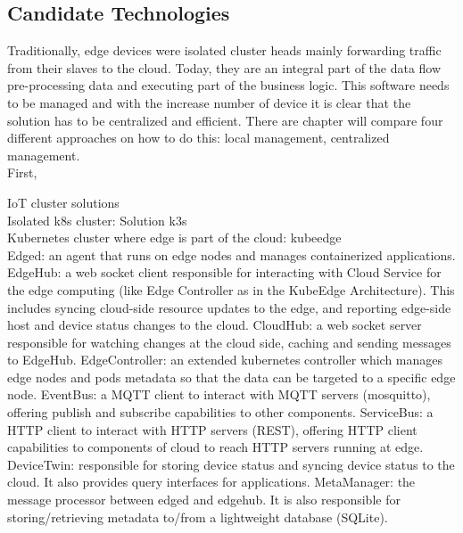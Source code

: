 \subsection{Candidate Technologies}
Traditionally, edge devices were isolated cluster heads mainly forwarding traffic from their slaves to the cloud. Today, they are an integral part of the data flow pre-processing data and executing part of the business logic. This software needs to be managed and with the increase number of device it is clear that the solution has to be centralized and efficient. There are  chapter will compare four different approaches on how to do this: local management, centralized management. \\
First,

IoT cluster solutions\\
Isolated k8s cluster: Solution k3s\\
Kubernetes cluster where edge is part of the cloud: kubeedge\\


Edged: an agent that runs on edge nodes and manages containerized applications.
EdgeHub: a web socket client responsible for interacting with Cloud Service for the edge computing (like Edge Controller as in the KubeEdge Architecture). This includes syncing cloud-side resource updates to the edge, and reporting edge-side host and device status changes to the cloud.
CloudHub: a web socket server responsible for watching changes at the cloud side, caching and sending messages to EdgeHub.
EdgeController: an extended kubernetes controller which manages edge nodes and pods metadata so that the data can be targeted to a specific edge node.
EventBus: a MQTT client to interact with MQTT servers (mosquitto), offering publish and subscribe capabilities to other components.
ServiceBus: a HTTP client to interact with HTTP servers (REST), offering HTTP client capabilities to components of cloud to reach HTTP servers running at edge.
DeviceTwin: responsible for storing device status and syncing device status to the cloud. It also provides query interfaces for applications.
MetaManager: the message processor between edged and edgehub. It is also responsible for storing/retrieving metadata to/from a lightweight database (SQLite).
